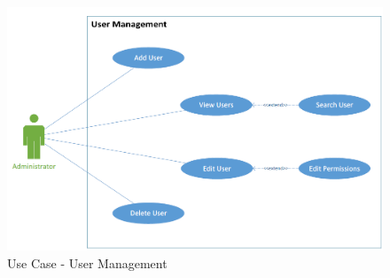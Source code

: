 \documentclass[twoside]{supsistudent}
\begin{document}
\begin{figure}[!h]
\centering
\includegraphics[scale=0.3]{usecase_administrator.png}
\caption{Use Case - User Management}
\end{figure}
\end{document}
